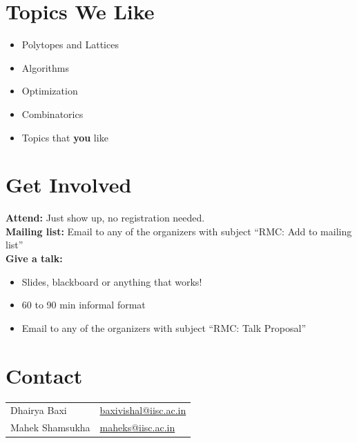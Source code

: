 \documentclass[12pt]{article}
\begin{document}
\section*{Topics We Like}

\begin{itemize}
    \item Polytopes and Lattices
    \item Algorithms
    \item Optimization
    \item Combinatorics
    \item Topics that \textbf{you} like
\end{itemize}


\section*{Get Involved}

\textbf{Attend:} Just show up, no registration needed. \\

\textbf{Mailing list:} Email to any of the organizers with subject ``RMC: Add to mailing list'' \\

\textbf{Give a talk:}
\begin{itemize}
    \item Slides, blackboard or anything that works!
    \item 60 to 90 min informal format
    \item Email to any of the organizers with subject ``RMC: Talk Proposal''
\end{itemize}


\section*{Contact}

\begin{tabular}{ll}
Dhairya Baxi & \href{mailto:baxivishal@iisc.ac.in}{baxivishal@iisc.ac.in} \\
Mahek Shamsukha & \href{mailto:maheks@iisc.ac.in}{maheks@iisc.ac.in}
\end{tabular}
\end{document}
